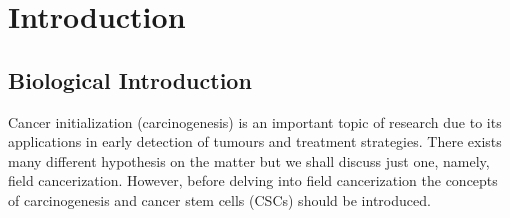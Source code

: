 \documentclass[\main/thesis.tex]{subfiles}
\begin{document}
\chapter{Introduction}

\section{Biological Introduction}

Cancer initialization (carcinogenesis) is an important topic of research due to its applications in early detection of tumours and treatment strategies. There exists many different hypothesis on the matter but we shall discuss just one, namely, field cancerization. However, before delving into field cancerization the concepts of carcinogenesis and cancer stem cells (CSCs) should be introduced.
\end{document}
